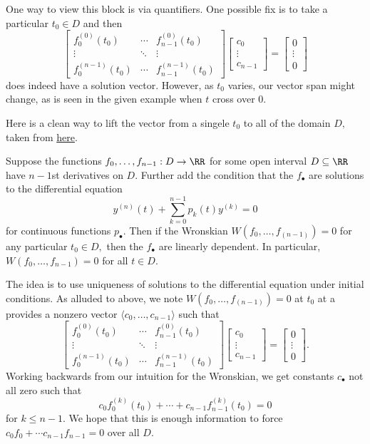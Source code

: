 One way to view this block is via quantifiers. One possible fix is to take a particular $t_0\in D$ and then
\[\begin{bmatrix}
    f_0^{(0)}(t_0) & \cdots & f_{n-1}^{(0)}(t_0)\\
    \vdots & \ddots & \vdots \\
    f_0^{(n-1)}(t_0) & \cdots & f_{n-1}^{(n-1)}(t_0)
\end{bmatrix}\begin{bmatrix} c_0 \\ \vdots \\ c_{n-1} \end{bmatrix}=\begin{bmatrix} 0 \\ \vdots \\ 0\end{bmatrix}\]
does indeed have a solution vector. However, as $t_0$ varies, our vector span might change, as is seen in the given example when $t$ cross over $0.$

Here is a clean way to lift the vector from a singele $t_0$ to all of the domain $D,$ taken from \href{https://math.stackexchange.com/a/1680662/869257}{here}.
\begin{proposition}
    Suppose the functions $f_0,\ldots,f_{n-1}:D\to\RR$ for some open interval $D\subseteq\RR$ have $n-1$st derivatives on $D.$ Further add the condition that the $f_\bullet$ are solutions to the differential equation
    \[y^{(n)}(t)+\sum_{k=0}^{n-1}p_k(t)y^{(k)}=0\]
    for continuous functions $p_\bullet.$ Then if the Wronskian $W(f_0,\ldots,f_{(n-1)})=0$ for any particular $t_0\in D,$ then the $f_\bullet$ are linearly dependent. In particular, $W(f_0,\ldots,f_{n-1})=0$ for all $t\in D.$
\end{proposition}
The idea is to use uniqueness of solutions to the differential equation under initial conditions. As alluded to above, we note $W(f_0,\ldots,f_{(n-1)})=0$ at $t_0$ at a provides a nonzero vector $\langle c_0,\ldots,c_{n-1}\rangle$ such that
\[\begin{bmatrix}
    f_0^{(0)}(t_0) & \cdots & f_{n-1}^{(0)}(t_0)\\
    \vdots & \ddots & \vdots \\
    f_0^{(n-1)}(t_0) & \cdots & f_{n-1}^{(n-1)}(t_0)
\end{bmatrix}\begin{bmatrix} c_0 \\ \vdots \\ c_{n-1} \end{bmatrix}=\begin{bmatrix} 0 \\ \vdots \\ 0\end{bmatrix}.\]
Working backwards from our intuition for the Wronskian, we get constants $c_\bullet$ not all zero such that
\[c_0f_0^{(k)}(t_0)+\cdots+c_{n-1}f_{n-1}^{(k)}(t_0)=0\]
for $k\le n-1.$ We hope that this is enough information to force $c_0f_0+\cdots c_{n-1}f_{n-1}=0$ over all $D.$

